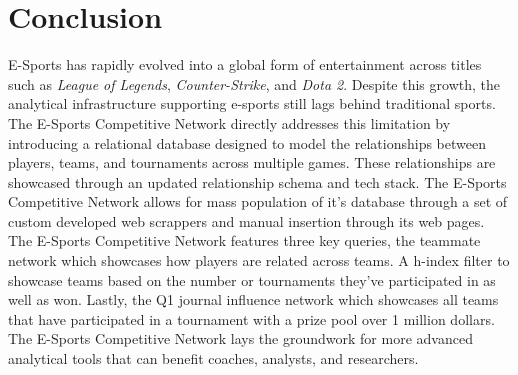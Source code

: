 \documentclass[sigconf]{acmart}
\begin{document}
\section{Conclusion}
E-Sports has rapidly evolved into a global form of entertainment across titles such as \textit{League of Legends}, \textit{Counter-Strike}, and \textit{Dota 2}. Despite this growth, the analytical infrastructure supporting e-sports still lags behind traditional sports. The E-Sports Competitive Network directly addresses this limitation by introducing a relational database designed to model the relationships between players, teams, and tournaments across multiple games. These relationships are showcased through an updated relationship schema and tech stack. The E-Sports Competitive Network allows for mass population of it's database through a set of custom developed web scrappers and manual insertion through its web pages. The E-Sports Competitive Network features three key queries, the teammate network which showcases how players are related across teams. A h-index filter to showcase teams based on the number or tournaments they've participated in as well as won. Lastly, the Q1 journal influence network which showcases all teams that have participated in a tournament with a prize pool over 1 million dollars. The E-Sports Competitive Network lays the groundwork for more advanced analytical tools that can benefit coaches, analysts, and researchers.


\cite{Shannon2003Cytoscape}
\cite{playwright_python}
\end{document}
